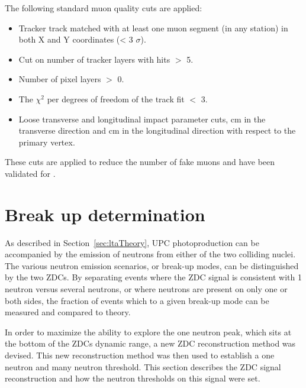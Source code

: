       The following standard muon quality cuts are applied:
      \begin{itemize}
        \item Tracker track matched with at least one muon segment 
          (in any station) in both X and Y coordinates (< 3 $\sigma$).
        \item Cut on number of tracker layers with hits $>$ 5.
        \item Number of pixel layers $>$ 0.
        \item The $\chi^{2}$ per degrees of freedom of the track fit $<$ 3. 
        \item Loose transverse and longitudinal impact parameter cuts, \DIFdelbegin {}\DIFdelend \DIFaddbegin {} 
          cm in the transverse direction and \DIFdelbegin {}\DIFdelend \DIFaddbegin {} cm in the longitudinal 
          direction with respect to the primary vertex.
      \end{itemize}
      These cuts are applied to reduce the number of fake muons and have been 
        validated for \DIFdelbegin {}\DIFdelend \DIFaddbegin {}\DIFaddend .

  \section{\label{sec:breakUpDet} Break up determination}
    As described in Section~\ref{sec:ltaTheory}, UPC \JPsi{} photoproduction 
      can be accompanied by the emission of neutrons from either of the two 
      colliding nuclei.
    The various neutron emission scenarios, or break-up modes, can 
      be distinguished by the two ZDCs.
    By separating events where the ZDC signal is consistent with 1 neutron 
      versus several neutrons, or where neutrons are present on only one or 
      both sides, the fraction of events which \DIFdelbegin {}\DIFdelend \DIFaddbegin {}\DIFaddend to a given 
      break-up mode can be measured and compared to theory. 

    In order to maximize the ability to explore the one neutron peak, which 
      sits at the bottom of the ZDCs dynamic range, a new ZDC reconstruction 
      method was devised. 
    This new reconstruction method was then used to establish a one neutron and
      many neutron threshold.
    This section describes the ZDC signal reconstruction and how the neutron 
      thresholds on this signal were set.

